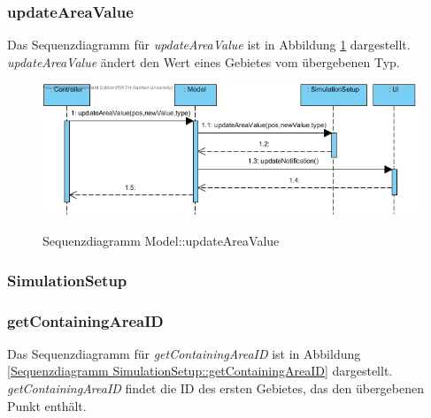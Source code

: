 \subsubsection*{updateAreaValue}

Das Sequenzdiagramm für \emph{updateAreaValue} ist in Abbildung \ref{Sequenzdiagramm Model::updateAreaValue} dargestellt. \emph{updateAreaValue} ändert den Wert eines Gebietes vom übergebenen Typ.

\begin{figure}[H]
	\centering
	\includegraphics[scale=.8]{Bilder/Model__updateAreaValue().jpg}\\
	\caption{Sequenzdiagramm Model::updateAreaValue}
	\label{Sequenzdiagramm Model::updateAreaValue}
\end{figure}

\newpage
\subsubsection{SimulationSetup}

\subsubsection*{getContainingAreaID}

Das Sequenzdiagramm für \emph{getContainingAreaID} ist in Abbildung \ref{Sequenzdiagramm SimulationSetup::getContainingAreaID} dargestellt. \emph{getContainingAreaID} findet die ID des ersten Gebietes, das den übergebenen Punkt enthält.

